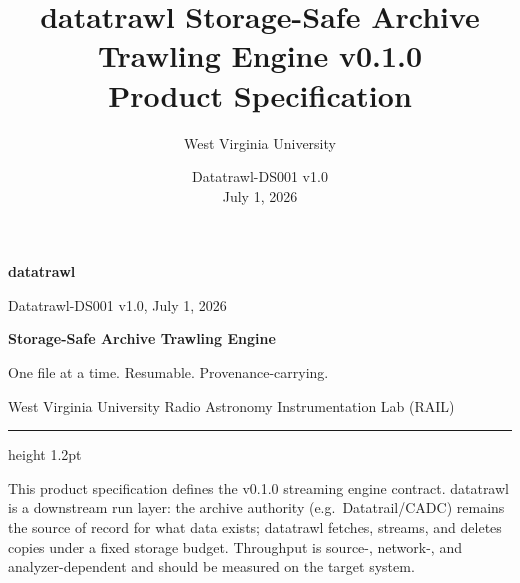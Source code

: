 \documentclass[10pt,letterpaper]{article}
\title{datatrawl Storage-Safe Archive Trawling Engine v0.1.0\\Product Specification}
\author{West Virginia University}
\date{Datatrawl-DS001 v1.0 \\ July 1, 2026}
\begin{document}
\thispagestyle{fancy}
{\sffamily
\begin{minipage}[t]{0.39\textwidth}
  {\fontsize{24}{26}\selectfont\bfseries\color{TrawlAmber}datatrawl}\par
  {\small Datatrawl-DS001 v1.0, July 1, 2026}
\end{minipage}%
\begin{minipage}[t]{0.61\textwidth}
  \raggedleft
  {\large\bfseries Storage-Safe Archive Trawling Engine}\par
  {\small One file at a time. Resumable. Provenance-carrying.}\par
  {\small West Virginia University Radio Astronomy Instrumentation Lab (RAIL)}
\end{minipage}
}
\vspace{6pt}
{\color{TrawlAmber}\hrule height 1.2pt}
\vspace{8pt}

{\small\color{TrawlGray}This product specification defines the v0.1.0 streaming
engine contract. datatrawl is a downstream run layer: the archive authority
(e.g.\ Datatrail/CADC) remains the source of record for what data exists;
datatrawl fetches, streams, and deletes copies under a fixed storage budget.
Throughput is source-, network-, and analyzer-dependent and should be measured
on the target system.}
\end{document}
